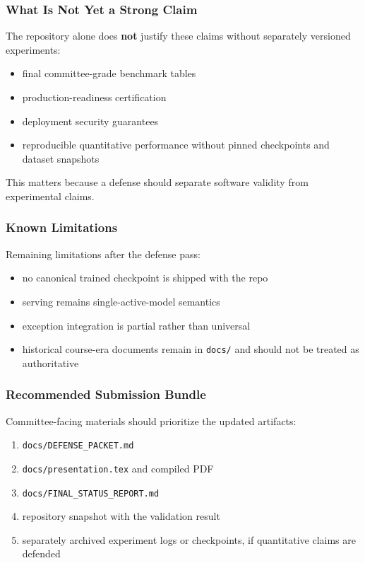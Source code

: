 \documentclass{beamer}
\begin{document}
\begin{frame}
  \frametitle{What Is Not Yet a Strong Claim}
  The repository alone does \textbf{not} justify these claims without separately versioned experiments:

  \begin{itemize}
    \item final committee-grade benchmark tables
    \item production-readiness certification
    \item deployment security guarantees
    \item reproducible quantitative performance without pinned checkpoints and dataset snapshots
  \end{itemize}

  \vspace{0.4cm}
  This matters because a defense should separate software validity from experimental claims.
\end{frame}

\begin{frame}
  \frametitle{Known Limitations}
  Remaining limitations after the defense pass:

  \begin{itemize}
    \item no canonical trained checkpoint is shipped with the repo
    \item serving remains single-active-model semantics
    \item exception integration is partial rather than universal
    \item historical course-era documents remain in \texttt{docs/} and should not be treated as authoritative
  \end{itemize}
\end{frame}

\begin{frame}
  \frametitle{Recommended Submission Bundle}
  Committee-facing materials should prioritize the updated artifacts:

  \begin{enumerate}
    \item \texttt{docs/DEFENSE\_PACKET.md}
    \item \texttt{docs/presentation.tex} and compiled PDF
    \item \texttt{docs/FINAL\_STATUS\_REPORT.md}
    \item repository snapshot with the validation result
    \item separately archived experiment logs or checkpoints, if quantitative claims are defended
  \end{enumerate}
\end{frame}
\end{document}
